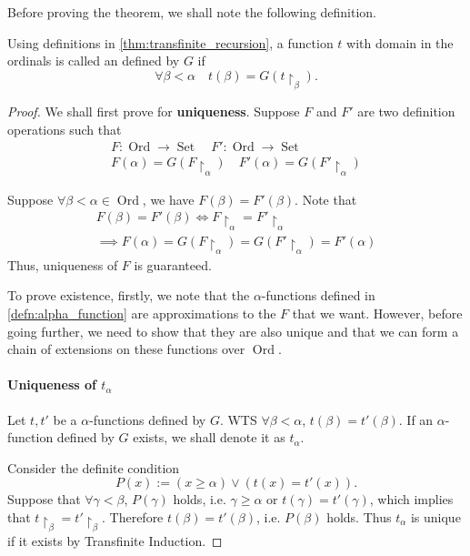 \documentclass[notoc,notitlepage]{tufte-book}
\DeclareMathOperator{\Ord}{Ord }
\DeclareMathOperator{\Set}{Set }
\begin{document}
Before proving the theorem, we shall note the following definition.

\begin{defn}
\label{defn:alpha_function}
  Using definitions in \cref{thm:transfinite_recursion}, a function $t$ with domain in the ordinals is called an  defined by $G$ if
  \begin{equation*}
    \forall \beta < \alpha \quad t(\beta) = G(t \restriction_\beta).
  \end{equation*}
\end{defn}

\begin{proof}
  We shall first prove for \textbf{uniqueness}. Suppose $F$ and $F'$ are two definition operations such that
  \begin{gather*}
    F: \Ord \to \Set \quad F' : \Ord \to \Set \\
    F(\alpha) = G(F\restriction_\alpha) \quad F'(\alpha) = G(F'\restriction_\alpha)
  \end{gather*}

  Suppose $\forall \beta < \alpha \in \Ord$, we have $F(\beta) = F'(\beta)$. Note that
  \begin{gather*}
    F(\beta) = F'(\beta) \iff F\restriction_\alpha = F'\restriction_\alpha \\
    \implies F(\alpha) = G(F\restriction_\alpha) = G(F'\restriction_\alpha) = F'(\alpha)
  \end{gather*}
  Thus, uniqueness of $F$ is guaranteed.

  To prove existence, firstly, we note that the $\alpha$-functions defined in \cref{defn:alpha_function} are approximations to the $F$ that we want. However, before going further, we need to show that they are also unique and that we can form a chain of extensions on these functions over $\Ord$.

  \paragraph{Uniqueness of $t_\alpha$} Let $t, t'$ be a $\alpha$-functions defined by $G$. WTS $\forall \beta < \alpha$, $t(\beta) = t'(\beta)$. If an $\alpha$-function defined by $G$ exists, we shall denote it as $t_\alpha$.

  Consider the definite condition
  \begin{equation*}
    P(x) := ( x \geq \alpha ) \lor ( t(x) = t'(x) ).
  \end{equation*}
  Suppose that $\forall \gamma < \beta$, $P(\gamma)$ holds, i.e. $\gamma \geq \alpha$ or $t(\gamma) = t'(\gamma)$, which implies that $t\restriction_\beta = t'\restriction_\beta$. Therefore $t(\beta) = t'(\beta)$, i.e. $P(\beta)$ holds. Thus $t_\alpha$ is unique if it exists by Transfinite Induction.


\end{proof}
\end{document}
